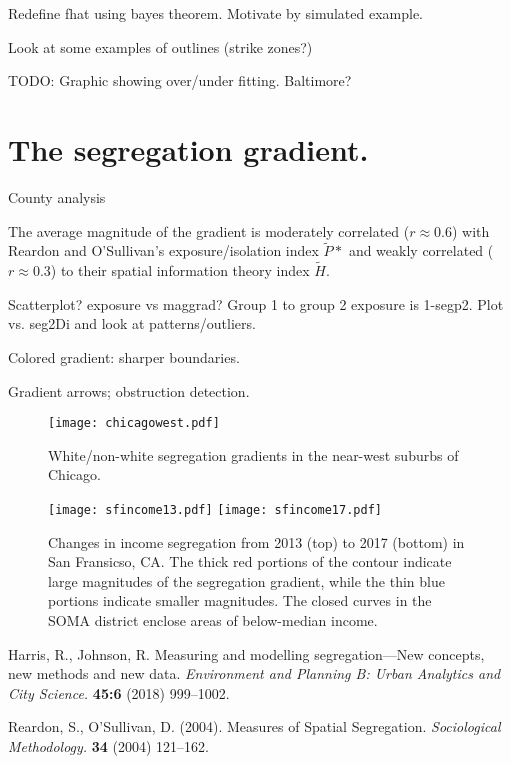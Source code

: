 \documentclass{article}
\theoremstyle{theorem}
\theoremstyle{definition}
\begin{document}
Redefine fhat using bayes theorem. Motivate by simulated example.

Look at some examples of outlines (strike zones?)

TODO: Graphic showing over/under fitting. Baltimore?

\section{The segregation gradient.}

County analysis

The average magnitude of the gradient is moderately correlated ($r \approx 0.6$) with Reardon and O'Sullivan's exposure/isolation index $\tilde{P}*$ and weakly correlated ($r\approx 0.3$) to their spatial information theory index $\tilde{H}$.

Scatterplot? exposure vs maggrad? Group 1 to group 2 exposure is 1-segp2. Plot vs. seg2Di and look at patterns/outliers.

Colored gradient: sharper boundaries.

Gradient arrows; obstruction detection.

\begin{figure}
  \texttt{[image: chicagowest.pdf]}
  \caption{White/non-white segregation gradients in the near-west suburbs of Chicago.}
  \label{fig:chicagowest}
\end{figure}

\begin{figure}
  \texttt{[image: sfincome13.pdf]}
  \texttt{[image: sfincome17.pdf]}
  \caption{Changes in income segregation from 2013 (top) to 2017 (bottom) in San Fransicso, CA. The thick red portions of the contour indicate large magnitudes of the segregation gradient, while the thin blue portions indicate smaller magnitudes. The closed curves in the SOMA district enclose areas of below-median income.}
  \label{fig:sfincome}
\end{figure}



\begin{thebibliography}{1}
Harris, R., Johnson, R. Measuring and modelling segregation---New concepts, new methods and new data. \textit{Environment and Planning B: Urban Analytics and City Science.} \textbf{45:6} (2018) 999--1002.

Reardon, S., O'Sullivan, D. (2004). Measures of Spatial Segregation. \textit{Sociological Methodology.} \textbf{34} (2004) 121--162.

%
\end{thebibliography}
\end{document}
